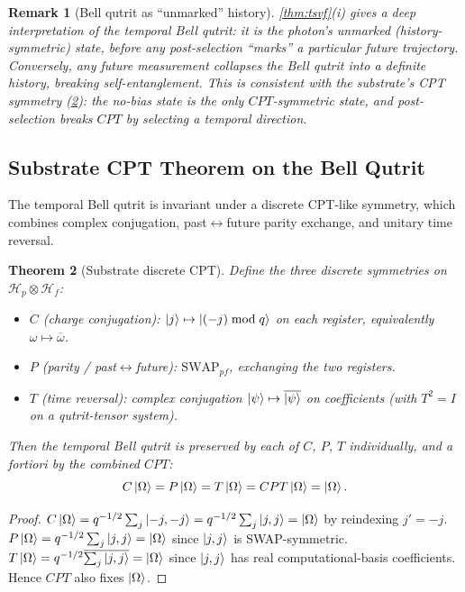 ﻿\documentclass[12pt]{article}
\newtheorem{theorem}{Theorem}[section]
\newtheorem{remark}[theorem]{Remark}
\begin{document}
\begin{remark}[Bell qutrit as ``unmarked'' history]
\cref{thm:tsvf}(i) gives a deep interpretation of the temporal Bell qutrit:
it is the photon's \emph{unmarked} (history-symmetric) state, before any
post-selection ``marks'' a particular future trajectory.  Conversely, any
future measurement collapses the Bell qutrit into a definite history,
breaking self-entanglement.  This is consistent with the substrate's CPT
symmetry (\cref{thm:cpt}): the no-bias state is the only $CPT$-symmetric
state, and post-selection breaks $CPT$ by selecting a temporal direction.
\end{remark}

\subsection{Substrate CPT Theorem on the Bell Qutrit}
\label{sec:cpt}

The temporal Bell qutrit is invariant under a discrete CPT-like
symmetry, which combines complex conjugation, past$\leftrightarrow$future
parity exchange, and unitary time reversal.

\begin{theorem}[Substrate discrete CPT]\label{thm:cpt}
Define the three discrete symmetries on $\mathcal H_p\otimes\mathcal H_f$:
\begin{itemize}[noitemsep]
  \item $C$ (charge conjugation):  $\ket{j} \mapsto \ket{(-j)\bmod q}$ on
    each register, equivalently $\omega \mapsto \overline\omega$.
  \item $P$ (parity / past$\leftrightarrow$future):
    $\mathrm{SWAP}_{pf}$, exchanging the two registers.
  \item $T$ (time reversal):  complex conjugation
    $\ket{\psi} \mapsto \overline{\ket{\psi}}$ on coefficients (with $T^2 = I$
    on a qutrit-tensor system).
\end{itemize}
Then the temporal Bell qutrit is preserved by each of $C$, $P$, $T$
individually, and \emph{a fortiori} by the combined $CPT$:
\begin{equation}
  C\ket{\Omega} = P\ket{\Omega} = T\ket{\Omega} = CPT\ket{\Omega} = \ket{\Omega}.
\end{equation}
\end{theorem}

\begin{proof}
$C\ket{\Omega} = q^{-1/2}\sum_j\ket{-j,-j} = q^{-1/2}\sum_j\ket{j,j} =
\ket{\Omega}$ by reindexing $j' = -j$.
$P\ket{\Omega} = q^{-1/2}\sum_j\ket{j,j} = \ket{\Omega}$ since $\ket{j,j}$
is SWAP-symmetric.
$T\ket{\Omega} = q^{-1/2}\overline{\sum_j\ket{j,j}} = \ket{\Omega}$ since
$\ket{j,j}$ has real computational-basis coefficients.
Hence $CPT$ also fixes $\ket{\Omega}$.
\end{proof}
\end{document}
